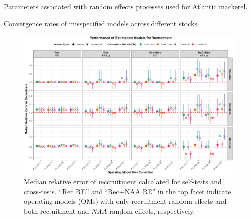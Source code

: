 \documentclass[
  12pt,
]{article}
\begin{document}
\begin{table}[H]
    \centering
    \caption{Parameters associated with random effects processes used for Atlantic mackerel.}
    \label{supp_mackerel_table}
    
\end{table}

\begin{table}[H]
    \centering
    \caption{Convergence rates of misspecified models across different stocks.}
    \label{supp_convergence_tab}
    
\end{table}

\renewcommand{\thetable}{\arabic{table}}

\renewcommand{\thefigure}{S\arabic{figure}}
\setcounter{figure}{0}

\begin{figure}[H]
\centering
\includegraphics[width=\textwidth]{Revised_Figures&Tables/OM_EM_Comparison_Plot_Rec.PNG}
\caption{Median relative error of reccruitment calculated for self-tests and cross-tests. ``Rec RE'' and ``Rec+NAA RE'' in the top facet indicate operating models (OMs) with only recruitment random effects and both recruitment and $NAA$ random effects, respectively.}
\label{fig:supp_OM_EM_Comparison_Plot_Rec}
\end{figure}
\end{document}
